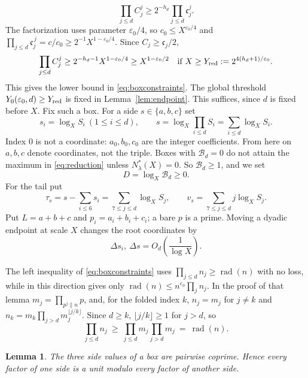 \documentclass{amsart}
\newtheorem{lemma}{Lemma}[section]
\theoremstyle{definition}
\theoremstyle{plain}
\numberwithin{equation}{section}
\numberwithin{table}{section}
\newcommand{\rad}{\operatorname{rad}}
\begin{document}
\[
 \prod_{j\le d}C_j^j\ge2^{-h_d}\prod_{j\le d}\mathfrak c_j^j.
\]
The factorization uses parameter $\varepsilon_0/4$, so
$c_0\le X^{\varepsilon_0/4}$ and
$\prod_{j\le d}\mathfrak c_j^{\,j}=c/c_0\ge2^{-1}X^{1-\varepsilon_0/4}$.
Since $C_j\ge\mathfrak c_j/2$,
\[
 \prod_{j\le d}C_j^j\ge2^{-h_d-1}X^{1-\varepsilon_0/4}
 \ge X^{1-\varepsilon_0/2}
 \quad\text{if }X\ge Y_{\rm red}:=2^{4(h_d+1)/\varepsilon_0}.
\]
This gives the lower bound in \eqref{eq:boxconstraints}. The global
threshold $Y_0(\varepsilon_0,d)\ge Y_{\rm red}$ is fixed in
Lemma~\ref{lem:endpoint}.
This suffices, since $d$ is fixed before $X$. Fix such a box. For a side $s\in\{a,b,c\}$ set
\begin{equation}\label{eq:coord}
 s_i=\log_XS_i\ (1\le i\le d),\qquad
 s=\log_X\!\prod_{i\le d}S_i=\sum_{i\le d}\log_XS_i .
\end{equation}
Index $0$ is not a coordinate: $a_0,b_0,c_0$ are the integer coefficients.
From here on $a,b,c$ denote coordinates, not the triple.
Boxes with $\mathcal B_d=0$ do not attain the maximum in \eqref{eq:reduction}
unless $N^*_{\lambda}(X)=0$. So $\mathcal B_d\ge1$, and we set
\begin{equation*}
 D=\log_X\mathcal B_d\ge0.
\end{equation*}
For the tail put
\begin{equation}\label{eq:tailcoord}
 \tau_s=s-\sum_{i\le6}s_i=\sum_{7\le j\le d}\log_XS_j,
 \qquad
 v_s=\sum_{7\le j\le d}j\log_XS_j .
\end{equation}
Put $L=a+b+c$ and $p_i=a_i+b_i+c_i$; a bare $p$ is a prime. Moving a
dyadic endpoint at scale $X$ changes the root coordinates by
\begin{equation}\label{eq:dyadicshift}
 \Delta s_i,\ \Delta s=O_d\!\left(\frac1{\log X}\right).
\end{equation}

The left inequality of \eqref{eq:boxconstraints} uses
$\prod_{j\le d}n_j\ge\rad(n)$ with no loss, while in this direction
\cite[Lemma~2.2]{BBLT} gives only $\rad(n)\le n^{\varepsilon_0}\prod_jn_j$. In the proof of that
lemma
$m_j=\prod_{p^{j}\|n}p$, and, for the folded index $k$, $n_j=m_j$ for
$j\ne k$ and $n_k=m_k\prod_{j>d}m_j^{\lfloor j/k\rfloor}$. Since $d\ge k$,
$\lfloor j/k\rfloor\ge1$ for $j>d$, so
\[
 \prod_{j\le d}n_j\ \ge\ \prod_{j\le d}m_j\prod_{j>d}m_j\ =\ \rad(n).
\]

\begin{lemma}\label{lem:coprime}
The three side values of a box are pairwise coprime. Hence every factor of one
side is a unit modulo every factor of another side.
\end{lemma}
\end{document}
